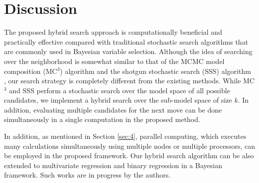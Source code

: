 \section{Discussion}
The proposed hybrid search approach is computationally beneficial and practically effective compared with traditional stochastic search algorithms that are commonly used in Bayesian variable selection. Although the idea of searching over the neighborhood is somewhat similar to that of the MCMC model composition (MC$^3$) algorithm \citep{madigan1995bayesian} and the shotgun stochastic search (SSS) algorithm \citep{hans2007shotgun}, our search strategy is completely different from the existing methods. While MC$^3$ and SSS perform a stochastic search over the model space of all possible candidates, we implement a hybrid search over the sub-model space of size $k$. In addition, evaluating multiple candidates for the next move can be done simultaneously in a single computation in the proposed method.

In addition, as mentioned in Section \ref{sec:4}, parallel computing, which executes many calculations simultaneously using multiple nodes or multiple processors, can be employed in the proposed framework. Our hybrid search algorithm can be also extended to multivariate regression and binary regression in a Bayesian framework. Such works are in progress by the authors.


\appendix
